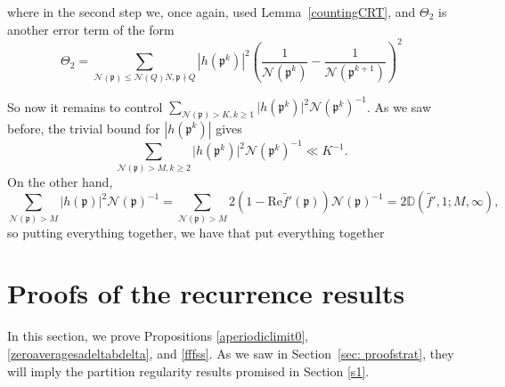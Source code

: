 \documentclass[11pt]{amsart}
\theoremstyle{definition}
\newcommand{\D}{{\mathbb D}}
\newcommand{\NN}{{\mathcal N}}
\newcommand{\Z}{{\mathbb Z}}
\newcommand{\mf}{\mathfrak}
\begin{document}
where in the second step we, once again, used Lemma~\ref{countingCRT}, and $\Theta_2$ is another error term of the form
\[
\Theta_2=\sum_{\NN(\mf p) \leq \NN(Q)N, \mf p \nmid Q} |h(\mf p^k)|^2 \left( \frac{1}{\NN(\mf p^k)}-\frac{1}{\NN(\mf p^{k+1})}\right)^2
\]

 
 So now it remains to control $\sum_{\NN(\mf p)>K, k\geq 1}\vert h(\mf p^{k})\vert^{2}\NN(\mf p^{k})^{-1}$. As we saw before, the trivial bound for $|h(\mf p^k)|$ gives
 $$\sum_{\NN(\mf p)>M, k\geq 2}\vert h(\mf p^{k})\vert^{2}\NN(\mf p^{k})^{-1}\ll K^{-1}.$$
 On the other hand,
 $$\sum_{\NN(\mf p)>M}\vert h(\mf p)\vert^{2}\NN(\mf p)^{-1}=\sum_{\NN(\mf p)>M}2(1-\text{Re}\tilde{f'}( \mf p))\NN(\mf p)^{-1}=2\D(\tilde{f'},1;M,\infty),$$
so putting everything together, we have that 
{\color{red} put everything together}

\fi

\section{Proofs of the recurrence results}\label{sec: proofmain}



In this section, we prove Propositions \ref{aperiodiclimit0},
\ref{zeroaveragesadeltabdelta}, and
\ref{fffss}.
  As we saw in Section~\ref{sec: proofstrat}, they will imply the partition regularity results promised in Section \ref{s1}.
\end{document}
